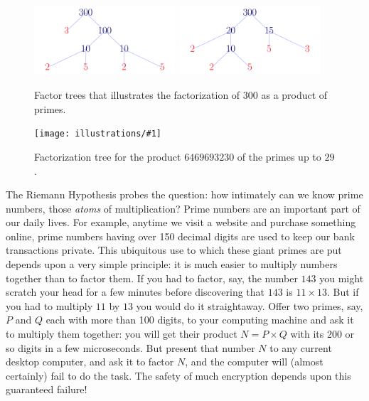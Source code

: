 \documentclass[11pt]{article}
\newcommand{\ill}[3]{ 
   \begin{figure}[H]
   \begin{center}
   \texttt{[image: illustrations/\#1]}
   \caption{#3}
   \end{center}
    \end{figure}
}
\theoremstyle{plain}
\theoremstyle{definition}
\numberwithin{equation}{section}
\numberwithin{figure}{section}
\numberwithin{table}{section}
\begin{document}
\begin{figure}[H]
\begin{center}
\includegraphics[width=0.47\textwidth]{illustrations/factor_tree_300_a}
\includegraphics[width=0.47\textwidth]{illustrations/factor_tree_300_b}
\caption{Factor trees that illustrates the factorization of 300 as a product of primes.\label{fig:factor300}}
\end{center}
\end{figure}

\ill{factor_tree_big}{1}{Factorization tree for the product $6469693230$ of the primes up to $29$.\label{factor.tree.big}}
 
                        
The Riemann Hypothesis probes the question: how intimately can we know
prime numbers, those {\em atoms} of multiplication?  Prime numbers are
an important part of our daily lives.  For example, anytime we visit a
website and purchase something online, prime numbers having over 150
decimal digits are used to keep our bank transactions private.  This
ubiquitous use to which these giant primes are put depends upon a very
simple principle: it is much easier to multiply numbers together than
to factor them. If you had to factor, say, the number $143$ you might
scratch your head for a few minutes before discovering that $143$ is
$11\times 13$. But if you had to multiply $11$ by $13$ you would do it
straightaway.  Offer two primes, say, $P$ and $Q$ each with more than
100 digits, to your computing machine and ask it to multiply them
together: you will get their product $N = P\times Q$ with its 200 or
so digits in a few microseconds. But present that number $N$ to any
current desktop computer, and ask it to factor $N$, and the computer
will (almost certainly) fail to do the task. The safety of much
encryption depends upon this guaranteed failure!
\end{document}
